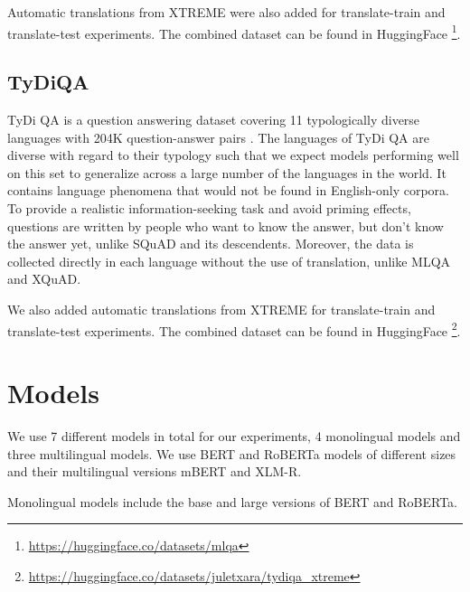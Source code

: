 \documentclass[11pt]{article}
\begin{document}
Automatic translations from XTREME \cite{XTREME} were also added for translate-train and translate-test experiments. The combined dataset can be found in HuggingFace \footnote{\url{https://huggingface.co/datasets/mlqa}}.

\subsection{TyDiQA}

TyDi QA is a question answering dataset covering 11 typologically diverse languages with 204K question-answer pairs \cite{tydiqa}. The languages of TyDi QA are diverse with regard to their typology such that we expect models performing well on this set to generalize across a large number of the languages in the world. It contains language phenomena that would not be found in English-only corpora. To provide a realistic information-seeking task and avoid priming effects, questions are written by people who want to know the answer, but don’t know the answer yet, unlike SQuAD and its descendents. Moreover, the data is collected directly in each language without the use of translation, unlike MLQA and XQuAD.

We also added automatic translations from XTREME \cite{XTREME} for translate-train and translate-test experiments. The combined dataset can be found in HuggingFace \footnote{\url{https://huggingface.co/datasets/juletxara/tydiqa_xtreme}}.

\section{Models}

We use 7 different models in total for our experiments, 4 monolingual models and three multilingual models. We use BERT and RoBERTa models of different sizes and their multilingual versions mBERT and XLM-R.

Monolingual models include the base and large versions of BERT and RoBERTa.
\end{document}
